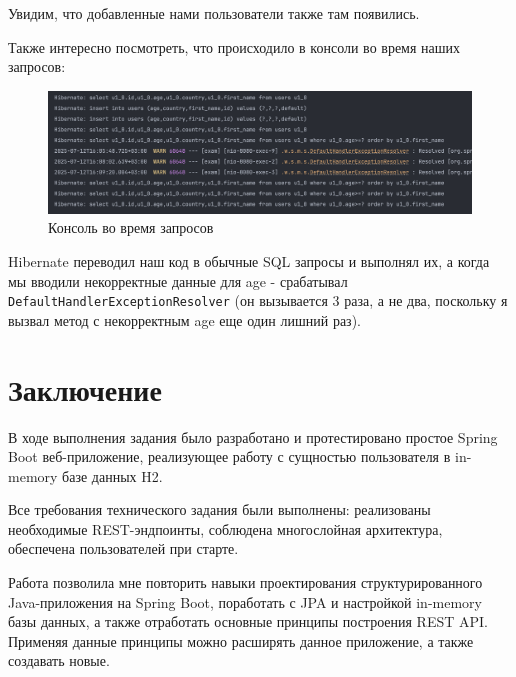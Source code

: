 \documentclass[a4paper, 14pt]{article}
\begin{document}
Увидим, что добавленные нами пользователи также там появились.

Также интересно посмотреть, что происходило в консоли во время наших запросов:

\begin{figure}[H]
	\centering
	\includegraphics[width=15cm]{resources/15.png}
	\caption{Консоль во время запросов}
\end{figure}

Hibernate переводил наш код в обычные SQL запросы и выполнял их, а когда мы вводили некорректные данные для age - срабатывал \texttt{DefaultHandlerExceptionResolver} (он вызывается 3 раза, а не два, поскольку я вызвал метод с некорректным age еще один лишний раз).

\newpage
\section{Заключение}

В ходе выполнения задания было разработано и протестировано простое Spring Boot веб-приложение, реализующее работу с сущностью пользователя в in-memory базе данных H2.

Все требования технического задания были выполнены: реализованы необходимые REST-эндпоинты, соблюдена многослойная архитектура, обеспечена пользователей при старте.

Работа позволила мне повторить навыки проектирования структурированного Java-приложения на Spring Boot, поработать с JPA и настройкой in-memory базы данных, а также отработать основные принципы построения REST API. Применяя данные принципы можно расширять данное приложение, а также создавать новые.
\end{document}
